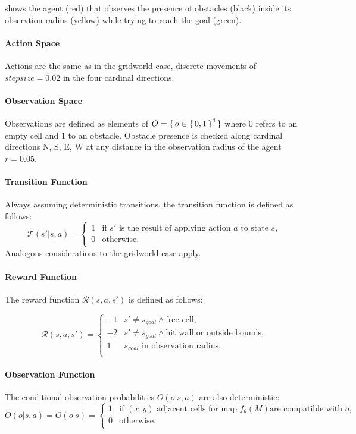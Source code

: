  shows the agent (red) that observes the presence of obstacles (black) inside its 
    observtion radius (yellow) while trying to reach the goal (green).


\paragraph{Action Space}
Actions are the same as in the gridworld case, discrete movements of $stepsize =0.02$
in the four cardinal directions.

\paragraph{Observation Space} Observations are defined as elements of 
$O = \set{ o \in \set{ 0, 1 }^4 }$ where $0$ refers to an empty cell and $1$ to an 
obstacle. Obstacle presence is checked along cardinal directions N, S, E, W at any distance 
in the observation radius of the agent $r = 0.05$.

\paragraph{Transition Function}
Always assuming deterministic transitions, the transition function is defined as follows:
$$\mathcal{T}(s'|s,a) =
\begin{cases}
    1 &   \text{if } s' \text{ is the result of applying action } a \text{ to state } s, \\
    0 &   \text{otherwise}. \\
\end{cases}
$$
Analogous considerations to the gridworld case apply.

\paragraph{Reward Function}

The reward function $\mathcal{R}(s,a,s')$ is defined as follows:


 $$\mathcal{R}(s,a,s') = 
    \begin{cases}
    -1 &  s' \neq s_{goal} \wedge \text{free cell}, \\ 
    -2 & s' \neq s_{goal}  \wedge \text{hit wall or outside bounds},\\
    1  & s_{goal} \text{ in observation radius}. \\
    \end{cases}    
$$

\paragraph{Observation Function}
The conditional observation probabilities $O(o|s,a)$ 
are also deterministic:
$$O(o|s,a)= O(o|s) = 
\begin{cases}
    1 &   \text{if } (x,y) \text{ adjacent cells for map } f_\theta(M) \text{are compatible with } o,\\
    0 &   \text{otherwise}. \\
\end{cases}
$$

